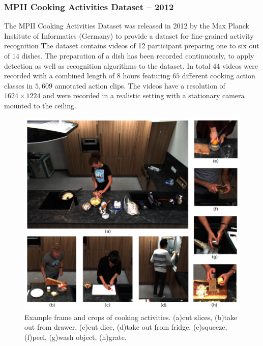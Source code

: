 \subsubsection{MPII Cooking Activities Dataset -- 2012}
\cite{rohrbach_database_2012}
The MPII Cooking Activities Dataset was released in 2012 by the Max Planck Institute of Informatics (Germany) to provide a dataset for fine-grained activity recognition
The dataset contains videos of 12 participant preparing one to six out of $14$ dishes.
The preparation of a dish has been recorded continuously, to apply detection as well as recognition algorithms to the dataset.
In total $44$ videos were recorded with a combined length of $8$ hours featuring $65$ different cooking action classes in $5,609$ annotated action clips.
The videos have a resolution of $1624 \times 1224$ and were recorded in a realistic setting with a stationary camera mounted to the ceiling.

\begin{figure}[H]
    \centering
    \includegraphics[width=\textwidth]{img_datasets/mpiicooking_example}
    \caption{Example frame and crops of cooking activities. (a)cut slices, (b)take out from drawer, (c)cut dice, (d)take out from fridge, (e)squeeze, (f)peel, (g)wash object, (h)grate. \cite{rohrbach_database_2012}}
    \label{fig:mpiicooking_example}
\end{figure}




